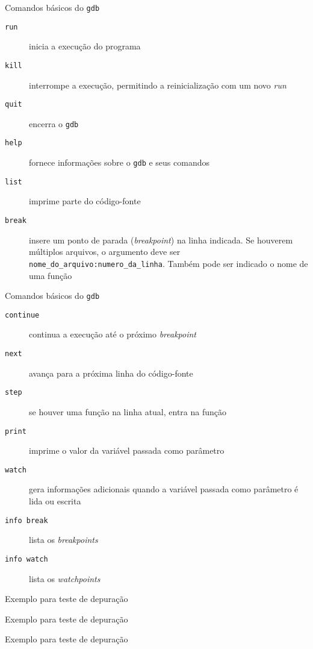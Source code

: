 \begin{frame}[fragile]{Comandos básicos do \texttt{gdb}}

	\begin{description}
		\item [\texttt{run}] inicia a {execução} do programa

		\item [\texttt{kill}] {interrompe} a execução, permitindo a reinicialização com um novo \textit{run}

		\item [\texttt{quit}] {encerra} o \texttt{gdb}

		\item [\texttt{help}] fornece {informações} sobre o \texttt{gdb} e seus comandos

		\item [\texttt{list}] {imprime} parte do código-fonte

		\item [\texttt{break}] insere um {ponto de parada} (\textit{breakpoint}) na linha indicada.
        Se houverem múltiplos arquivos, o argumento deve ser 
        \texttt{nome\_do\_arquivo:numero\_da\_linha}. Também pode ser indicado o nome de uma função

	\end{description}

\end{frame}

\begin{frame}[fragile]{Comandos básicos do \texttt{gdb}}

	\begin{description}
		\item [\texttt{continue}] {continua} a execução até o {próximo} \textit{breakpoint}

		\item [\texttt{next}] {avança} para a {próxima linha} do código-fonte

		\item [\texttt{step}] se houver uma {função} na linha atual, entra na função

		\item [\texttt{print}] {imprime} o valor da {variável} passada como parâmetro

		\item [\texttt{watch}] gera informações {adicionais} quando a variável passada como 
        parâmetro é {lida} ou {escrita}

		\item [\texttt{info break}] {lista} os \textit{breakpoints}
					
		\item [\texttt{info watch}] {lista} os \textit{watchpoints}

	\end{description}

\end{frame}

\begin{frame}[fragile]{Exemplo para teste de depuração}
\end{frame}

\begin{frame}[fragile]{Exemplo para teste de depuração}
\end{frame}

\begin{frame}[fragile]{Exemplo para teste de depuração}
\end{frame}
